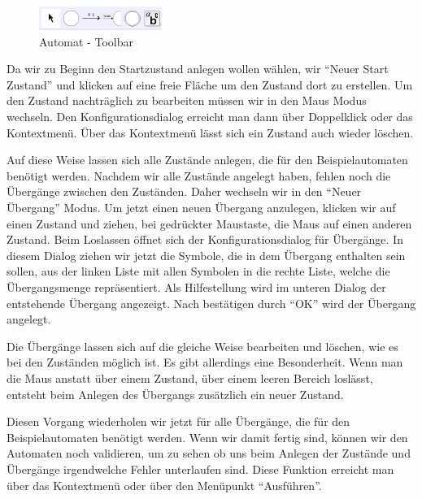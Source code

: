 \begin{figure}[h]
\begin{center}
\includegraphics[width=4cm]{images/machine_toolbar.png}
\caption{Automat - Toolbar}
\end{center}
\end{figure}

Da wir zu Beginn den Startzustand anlegen wollen wählen, wir "`Neuer
Start Zustand"' und klicken auf eine freie Fläche um den Zustand dort zu
erstellen. Um den Zustand nachträglich zu bearbeiten müssen wir in den Maus
Modus wechseln. Den Konfigurationsdialog erreicht man dann über Doppelklick oder das
Kontextmenü. Über das Kontextmenü lässt sich ein Zustand
auch wieder löschen.\vspace{10pt}

Auf diese Weise lassen sich alle Zustände anlegen, die für den Beispielautomaten
benötigt werden. Nachdem wir alle Zustände angelegt haben, fehlen noch die
Übergänge zwischen den Zuständen. Daher wechseln wir in den "`Neuer Übergang"'
Modus. Um jetzt einen neuen Übergang anzulegen, klicken wir auf einen Zustand 
und ziehen, bei gedrückter Maustaste, die Maus auf einen anderen Zustand. Beim
Loslassen öffnet sich der Konfigurationsdialog für Übergänge. In diesem Dialog 
ziehen wir jetzt die Symbole, die in dem Übergang enthalten sein sollen, aus
der linken Liste mit allen Symbolen in die rechte Liste, welche die
Übergangsmenge repräsentiert. Als Hilfestellung wird im unteren Dia\-log der entstehende
Übergang angezeigt. Nach bestätigen durch "`OK"' wird der Übergang
angelegt.\vspace{10pt}

Die Übergänge lassen sich auf die gleiche Weise bearbeiten und löschen, wie
es bei den Zuständen möglich ist. Es gibt allerdings eine Besonderheit. Wenn
man die Maus anstatt über einem Zustand, über einem leeren Bereich
loslässt, entsteht beim Anlegen des Übergangs zusätzlich ein neuer Zustand.\vspace{10pt}

Diesen Vorgang wiederholen wir jetzt für alle Übergänge, die
für den Beispielautomaten benötigt werden. Wenn wir damit fertig sind, können
wir den Automaten noch validieren, um zu sehen ob uns beim Anlegen der Zustände
und Übergänge irgendwelche Fehler unterlaufen sind. Diese Funktion erreicht man
über das Kontextmenü oder über den Menüpunkt "`Ausführen"'.\vspace{10pt}


